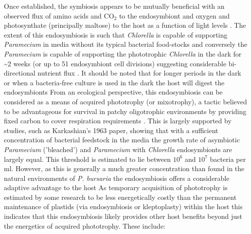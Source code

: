 Once established, the symbiosis appears to be mutually beneficial with an observed flux of amino acids and CO$_{2}$ to the endosymbiont and oxygen and photosynthate (principally maltose) to the host as a function of light levels \citep{Karakashian1963}.
The extent of this endosymbiosis is such that \textit{Chlorella} is capable of supporting \textit{Paramecium} in media without its typical bacterial food-stocks and conversely the \textit{Paramecium} is capable of supporting the phototrophic \textit{Chlorella} in the dark for \textasciitilde 2 weeks (or up to 51 endosymbiont cell divisions) suggesting considerable bi-directional nutrient flux \citep{Siegel1960,Karakashian1963}.
It should be noted that for longer periods in the dark or when a bacteria-free culture is used in the dark the host will digest the endosymbionts \citep{Parker1926}
From an ecological perspective, this endosymbiosis can be considered as a means of acquired phototrophy (or mixotrophy), a tactic believed to be advantageous for survival in patchy oligotrophic environments by providing fixed carbon to cover respiration requirements \citep{Putt1990}.
This is largely supported by studies, such as Karkashian's 1963 paper, showing that with a sufficient concentration of bacterial feedstock in the media the growth rate of asymbiotic \textit{Paramecium} ('bleached') and \textit{Paramecium} with \textit{Chlorella} endosymbionts are largely equal.
This threshold is estimated to lie between $10^{6}$ and $10^{7}$ bacteria per ml.  
However, as this is generally a much greater concentration than found in the natural environments of \textit{P. bursaria} the endosymbiosis offers a considerable adaptive advantage to the host \citep{Karakashian1963}
As temporary acquisition of phototrophy is estimated by some research \citep{Raven1997} to be less energetically costly than the permanent maintenance of plastids (via endosymbiosis or kleptoplasty) within the host this indicates that this endosymbiosis likely provides other host benefits beyond just the energetics of acquired phototrophy. These include: 
